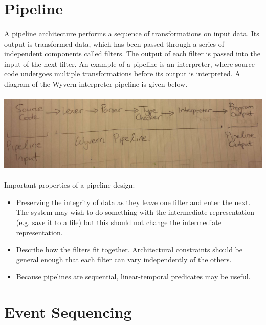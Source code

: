 \documentclass{article}
\begin{document}
\section{Pipeline}

\paragraph{}
A pipeline architecture performs a sequence of transformations on input data. Its output is transformed data, which has been passed through a series of independent components called filters. The output of each filter is passed into the input of the next filter. An example of a pipeline is an interpreter, where source code undergoes multiple transformations before its output is interpreted. A diagram of the Wyvern interpreter pipeline is given below.

\paragraph{}
\includegraphics[width=\textwidth]{pipeline.jpeg}

\paragraph{}
Important properties of a pipeline design:
\begin{itemize}
	\item Preserving the integrity of data as they leave one filter and enter the next. The system may wish to do something with the intermediate representation (e.g. save it to a file) but this should not change the intermediate representation.
	\item Describe how the filters fit together. Architectural constraints should be general enough that each filter can vary independently of the others.
	\item Because pipelines are sequential, linear-temporal predicates may be useful.
\end{itemize}

\section{Event Sequencing}
\end{document}
